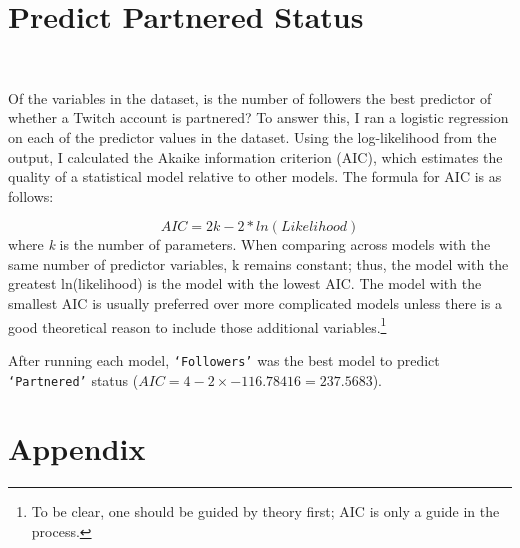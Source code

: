 \documentclass[12pt]{article}
\begin{document}
\section{Predict Partnered Status}\

Of the variables in the dataset, is the number of followers the best predictor of whether a Twitch account is partnered? To answer this, I ran a logistic regression on each of the predictor values in the dataset. Using the log-likelihood from the output, I calculated the Akaike information criterion (AIC), which estimates the quality of a statistical model relative to other models. The formula for AIC is as follows:

\begin{equation}
AIC = 2k -2 \ast ln(Likelihood)
\end{equation}
where \emph{k} is the number of parameters. When comparing across models with the same number of predictor variables, k remains constant; thus, the model with the greatest ln(likelihood) is the model with the lowest AIC. The model with the smallest AIC is usually preferred over more complicated models unless there is a good theoretical reason to include those additional variables.\footnote{To be clear, one should be guided by theory first; AIC is only a guide in the process.}

After running each model, \texttt{`Followers'} was the best model to predict \texttt{`Partnered'} status ($AIC = 4 - 2 \times -116.78416 = 237.5683$).

\newpage

\section{Appendix}
\end{document}
